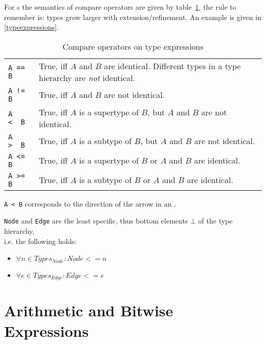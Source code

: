 For s the semantics of compare operators are given by table~\ref{compandtypes},
the rule to remember is: types grow larger with extension/refinement. An example is given in \ref{typeexpressions}.
\begin{table}[htbp]
  \centering
  \begin{tabularx}{\linewidth}{|l|X|} \hline
    \texttt{A == B} & True, iff $A$ and $B$ are identical. Different types in a type hierarchy are \emph{not} identical. \\
    \texttt{A != B} & True, iff $A$ and $B$ are not identical. \\
    \texttt{A <\ \ B} & True, iff $A$ is a supertype of $B$, but $A$ and $B$ are not identical. \\
    \texttt{A >\ \ B} & True, iff $A$ is a subtype of $B$, but $A$ and $B$ are not identical. \\
    \texttt{A <= B} & True, iff $A$ is a supertype of $B$ or $A$ and $B$ are identical. \\
    \texttt{A >= B} & True, iff $A$ is a subtype of $B$ or $A$ and $B$ are identical. \\ \hline
  \end{tabularx}
  \caption{Compare operators on type expressions}
  \label{compandtypes}
\end{table}
\begin{note}
  \texttt{A < B} corresponds to the direction of the arrow in an .
\end{note}
\begin{note}
  \texttt{Node} and \texttt{Edge} are the least specific, thus bottom elements $\bot$ of the type hierarchy,\\
  i.e. the following holds:
  \begin{itemize}
    \item $\forall n\in Types_{Node}: Node <= n$
    \item $\forall e\in Types_{Edge}: Edge <= e$
  \end{itemize}
\end{note}


\section{Arithmetic and Bitwise Expressions}

